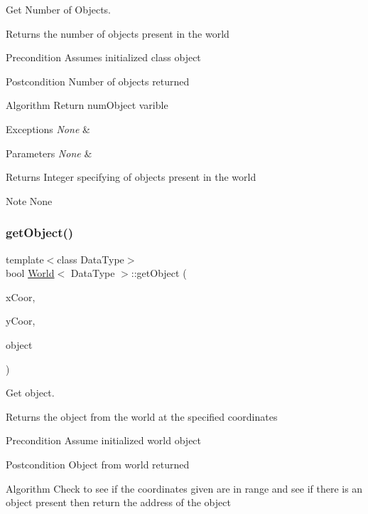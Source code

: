Get Number of Objects. 

Returns the number of objects present in the world

\begin{DoxyPrecond}{Precondition}
Assumes initialized class object
\end{DoxyPrecond}
\begin{DoxyPostcond}{Postcondition}
Number of objects returned
\end{DoxyPostcond}
\begin{DoxyParagraph}{Algorithm}
Return num\+Object varible
\end{DoxyParagraph}

\begin{DoxyExceptions}{Exceptions}
{\em None} & \\
\hline
\end{DoxyExceptions}

\begin{DoxyParams}{Parameters}
{\em None} & \\
\hline
\end{DoxyParams}
\begin{DoxyReturn}{Returns}
Integer specifying of objects present in the world
\end{DoxyReturn}
\begin{DoxyNote}{Note}
None 
\end{DoxyNote}
\hypertarget{class_world_abb9d5ae67756239aa2083c9898de5e15}{}\label{class_world_abb9d5ae67756239aa2083c9898de5e15} 
\subsubsection{\texorpdfstring{get\+Object()}{getObject()}}
{\footnotesize\ttfamily template$<$class Data\+Type$>$ \\
bool \hyperlink{class_world}{World}$<$ Data\+Type $>$\+::get\+Object (\begin{DoxyParamCaption}\item[{int}]{x\+Coor,  }\item[{int}]{y\+Coor,  }\item[{Data\+Type $\ast$\&}]{object }\end{DoxyParamCaption})}



Get object. 

Returns the object from the world at the specified coordinates

\begin{DoxyPrecond}{Precondition}
Assume initialized world object
\end{DoxyPrecond}
\begin{DoxyPostcond}{Postcondition}
Object from world returned
\end{DoxyPostcond}
\begin{DoxyParagraph}{Algorithm}
Check to see if the coordinates given are in range and see if there is an object present then return the address of the object
\end{DoxyParagraph}

